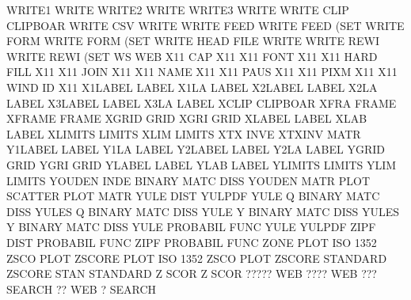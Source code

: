 WRITE1                                  WRITE
WRITE2                                  WRITE
WRITE3                                  WRITE
WRITE    CLIP                           CLIPBOAR
WRITE    CSV                            WRITE
WRITE    FEED                           WRITE    FEED (SET
WRITE    FORM                           WRITE    FORM (SET
WRITE    HEAD FILE                      WRITE
WRITE    REWI                           WRITE    REWI (SET
WS                                      WEB
X11      CAP                            X11
X11      FONT                           X11
X11      HARD FILL                      X11
X11      JOIN                           X11
X11      NAME                           X11
X11      PAUS                           X11
X11      PIXM                           X11
X11      WIND ID                        X11
X1LABEL                                 LABEL
X1LA                                    LABEL
X2LABEL                                 LABEL
X2LA                                    LABEL
X3LABEL                                 LABEL
X3LA                                    LABEL
XCLIP                                   CLIPBOAR
XFRA                                    FRAME
XFRAME                                  FRAME
XGRID                                   GRID
XGRI                                    GRID
XLABEL                                  LABEL
XLAB                                    LABEL
XLIMITS                                 LIMITS
XLIM                                    LIMITS
XTX      INVE                           XTXINV   MATR
Y1LABEL                                 LABEL
Y1LA                                    LABEL
Y2LABEL                                 LABEL
Y2LA                                    LABEL
YGRID                                   GRID
YGRI                                    GRID
YLABEL                                  LABEL
YLAB                                    LABEL
YLIMITS                                 LIMITS
YLIM                                    LIMITS
YOUDEN   INDE                           BINARY   MATC DISS
YOUDEN   MATR PLOT                      SCATTER  PLOT MATR
YULE     DIST                           YULPDF
YULE     Q                              BINARY   MATC DISS
YULES    Q                              BINARY   MATC DISS
YULE     Y                              BINARY   MATC DISS
YULES    Y                              BINARY   MATC DISS
YULE                                    PROBABIL FUNC
YULE                                    YULPDF
ZIPF     DIST                           PROBABIL FUNC
ZIPF                                    PROBABIL FUNC
ZONE     PLOT                           ISO      1352 ZSCO PLOT
ZSCORE   PLOT                           ISO      1352 ZSCO PLOT
ZSCORE                                  STANDARD
ZSCORE   STAN                           STANDARD
Z        SCOR                           Z        SCOR
?????                                   WEB
????                                    WEB
???                                     SEARCH
??                                      WEB
?                                       SEARCH
